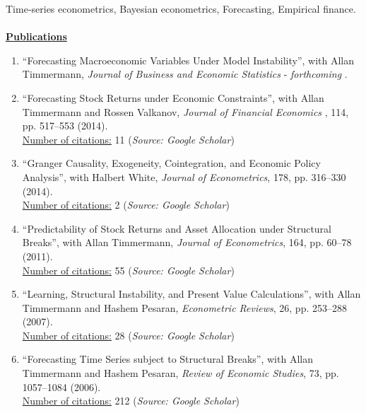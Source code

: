 \documentclass[12pt]{article}
\begin{document}
Time-series econometrics, Bayesian econometrics, Forecasting, Empirical finance.\\ \\
\underline{\textbf{Publications}}
\begin{enumerate}	
  \item ``Forecasting Macroeconomic Variables Under Model Instability'', with Allan Timmermann, \emph{Journal of Business and Economic Statistics} - \textit{forthcoming} .
	
	\item ``Forecasting Stock Returns under Economic Constraints'', with Allan Timmermann and Rossen Valkanov, \emph{Journal of Financial Economics} , 114, pp. 517--553 (2014). \\
	\underline{Number of citations:} 11 (\emph{Source: Google Scholar})
	
	\item ``Granger Causality, Exogeneity, Cointegration, and Economic Policy Analysis'', with Halbert White, \emph{Journal of Econometrics}, 178, pp. 316--330 (2014). \\
	\underline{Number of citations:} 2 (\emph{Source: Google Scholar})
	
	\item ``Predictability of Stock Returns and Asset Allocation under Structural Breaks'', with Allan Timmermann, \emph{Journal of Econometrics}, 164, pp. 60--78 (2011). \\
	\underline{Number of citations:} 55 (\emph{Source: Google Scholar})
	
	\item ``Learning, Structural Instability, and Present Value Calculations'', with Allan Timmermann and Hashem Pesaran, \emph{Econometric Reviews}, 26, pp. 253--288 (2007). \\
	\underline{Number of citations:} 28 (\emph{Source: Google Scholar})

	\item ``Forecasting Time Series subject to Structural Breaks'', with Allan Timmermann and Hashem Pesaran, \emph{Review of Economic Studies}, 73, pp. 1057--1084 (2006). \\
	\underline{Number of citations:} 212 (\emph{Source: Google Scholar})

    \setcounter{enumTemp}{\theenumi}
 \end{enumerate}
\end{document}

